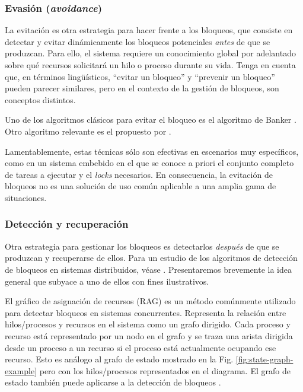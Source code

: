 \subsubsection{Evasión (\textit{avoidance})}

La evitación es otra estrategia para hacer frente a los bloqueos, que consiste en detectar y evitar
dinámicamente los bloqueos potenciales \emph{antes} de que se produzcan. Para ello, el sistema
requiere un conocimiento global por adelantado sobre qué recursos solicitará un hilo o proceso
durante su vida. Tenga en cuenta que, en términos lingüísticos, ``evitar un bloqueo''
y ``prevenir un bloqueo'' pueden parecer similares, pero en el contexto de la gestión de bloqueos, son
conceptos distintos.

Uno de los algoritmos clásicos para evitar el bloqueo es el algoritmo de Banker \cite{dijkstra1964}.
Otro algoritmo relevante es el propuesto por \cite{habermann1969prevention}.

Lamentablemente, estas técnicas sólo son efectivas en escenarios muy específicos, como en un
sistema embebido en el que se conoce a priori
el conjunto completo de tareas a ejecutar y el \textit{locks} necesarios.
En consecuencia, la evitación de bloqueos no es una solución de uso
común aplicable a una amplia gama de situaciones.

\subsubsection{Detección y recuperación}

Otra estrategia para gestionar los bloqueos es detectarlos \emph{después} de que se produzcan y
recuperarse de ellos. Para un estudio de los algoritmos de detección de bloqueos en sistemas
distribuidos, véase \cite{singhal1989deadlock}. Presentaremos brevemente la idea general que subyace a
uno de ellos con fines ilustrativos.

El gráfico de asignación de recursos (\acrfull{RAG}) es un método comúnmente utilizado para detectar
bloqueos en sistemas concurrentes. Representa la relación entre hilos/procesos y recursos en el
sistema como un grafo dirigido. Cada proceso y recurso está representado por un nodo en el
grafo y se traza una arista dirigida desde un proceso a un recurso si el proceso está actualmente
ocupando ese recurso.
Esto es análogo al grafo de estado mostrado en la Fig. \ref{fig:state-graph-example} pero con los
hilos/procesos representados en el diagrama. El grafo de estado también puede aplicarse a la
detección de bloqueos \cite{coffman1971deadlocks}.

